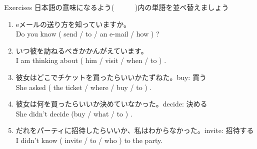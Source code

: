 \documentclass[aspectratio=169,xcolor={dvipsnames,table}]{beamer}
\begin{document}
\begin{frame}[plain]{Exercises}
日本語の意味になるよう(~~~~~~)内の単語を並べ替えましょう

 \begin{enumerate}
  \item eメールの送り方を知っていますか。\\%
	Do you know ( send / to / an e-mail / how ) ?\hfill{}
	\visible<2->{\textcolor{BurntOrange}{\bfseries how to send an e-mail}}
  \item いつ彼を訪ねるべきかかんがえています。\\
	I am thinking about ( him / visit / when / to ) .\hfill{}
	\visible<3->{\textcolor{BurntOrange}{\bfseries when to visit him}}
  \item 彼女はどこでチケットを買ったらいいかたずねた。\hfill{\scriptsize buy: 買う}\\
	She asked ( the ticket / where / buy / to  ) .\hfill{}
	\\
  \item 彼女は何を買ったらいいか決めていなかった。\hfill{\scriptsize decide: 決める}\\
	She didn't decide (buy / what / to ) .
	\hfill\visible<5->{\textcolor{BurntOrange}{\bfseries what to buy}}
  \item だれをパーティに招待したらいいか、私はわからなかった。\hfill{\scriptsize invite: 招待する}\\
	I didn't know ( invite / to / who ) to the party.\hfill{}
	\visible<6->{\textcolor{BurntOrange}{\bfseries who to invite}}
 \end{enumerate}
\end{frame}
\end{document}
